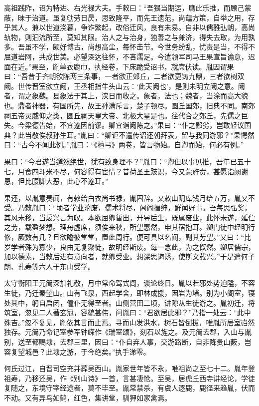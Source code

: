 \documentclass[12pt,UTF8]{ctexbook}
\begin{document}
高祖践阼，诏为特进、右光禄大夫。手敕曰：“吾猥当期运，膺此乐推，而顾己蒙蔽，昧于治道。虽复劬劳日昃，思致隆平，而先王遗范，尚蕴方策，自举之用，存乎其人。兼以世道浇暮，争诈繁起，改俗迁风，良有未易。自非以儒雅弘朝，高尚轨物，则汩流所至，莫知其限。治人之与治身，独善之与兼济，得失去取，为用孰多。吾虽不学，颇好博古，尚想高尘，每怀击节。今世务纷乱，忧责是当，不得不屈道岩阿，共成世美。必望深达往怀，不吝濡足。今遣领军司马王果宣旨谕意，迟面在近。”果至，胤单衣鹿巾，执经卷，下床跪受诏书，就席伏读。胤因谓果曰：“吾昔于齐朝欲陈两三条事，一者欲正郊丘，二者欲更铸九鼎，三者欲树双阙。世传晋室欲立阙，王丞相指牛头山云：‘此天阙也’，是则未明立阙之意。阙者，谓之象魏。县象法于其上，浃日而收之。象者，法也；魏者，当涂而高大貌也。鼎者神器，有国所先，故王孙满斥言，楚子顿尽。圆丘国郊，旧典不同。南郊祠五帝灵威仰之类，圆丘祠天皇大帝、北极大星是也。往代合之郊丘，先儒之巨失。今梁德告始，不宜遂因前谬。卿宜诣阙陈之。”果曰：“仆之鄙劣，岂敢轻议国典？此当敬俟叔孙生耳。”胤曰：“卿讵不遣传诏还朝拜表，留与我同游邪？”果愕然曰：“古今不闻此例。”胤曰：“《檀弓》两卷，皆言物始。自卿而始，何必有例。”

果曰：“今君遂当邈然绝世，犹有致身理不？”胤曰：“卿但以事见推，吾年已五十七，月食四斗米不尽，何容得有宦情？昔荷圣王跂识，今又蒙旌贲，甚愿诣阙谢恩，但比腰脚大恶，此心不遂耳。”

果还，以胤意奏闻，有敕给白衣尚书禄，胤固辞。又敕山阴库钱月给五万，胤又不受。乃敕胤曰：“顷者学业沦废，儒术将尽，闾阎搢绅，鲜闻好事。吾每思弘奖，其风未移，当扆兴言为叹。本欲屈卿暂出，开导后生，既属废业，此怀未遂，延伫之劳，载盈梦想。理舟虚席，须俟来秋，所望惠然，申其宿抱耳。卿门徒中经明行修，厥数有几？且欲瞻彼堂堂，置此周行。便可具以名闻，副其劳望。”又曰：“比岁学者殊为寡少，良由无复聚徒，故明经斯废。每一念此，为之慨然。卿居儒宗，加以德素，当敕后进有意向者，就卿受业。想深思诲诱，使斯文载兴。”于是遣何子朗、孔寿等六人于东山受学。

太守衡阳王元简深加礼敬，月中常命驾式闾，谈论终日。胤以若邪处势迫隘，不容生徒，乃迁秦望山。山有飞泉，西起学舍，即林成援，因岩为堵。别为小阁室，寝处其中，躬自启闭，僮仆无得至者。山侧营田二顷，讲隙从生徒游之。胤初迁，将筑室，忽见二人著玄冠，容貌甚伟，问胤曰：“君欲居此邪？”乃指一处云：“此中殊吉。”忽不复见，胤依其言而止焉。寻而山发洪水，树石皆倒拔，唯胤所居室岿然独存。元简乃命记室参军钟嵘作《瑞室颂》，刻石以旌之。及元简去郡，入山与胤别，送至都赐埭，去郡三里，因曰：“仆自弃人事，交游路断，自非降贵山薮，岂容复望城邑？此埭之游，于今绝矣。”执手涕零。

何氏过江，自晋司空充并葬吴西山。胤家世年皆不永，唯祖尚之至七十二。胤年登祖寿，乃移还吴，作《别山诗》一首，言甚凄怆。至吴，居虎丘西寺讲经论，学徒复随之，东境守宰经途者，莫不毕至。胤常禁杀，有虞人逐鹿，鹿径来趋胤，伏而不动。又有异鸟如鹤，红色，集讲堂，驯狎如家禽焉。
\end{document}
